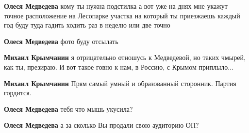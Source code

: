 \begin{itemize}
\begin{itemize}
\textbf{Олеся Медведева} кому ты нужна подстилка а вот уже на днях мне укажут точное расположение на Лесопарке участка на который ты приезжаешь каждый год буду туда гадить ходить раз в неделю или две точно

 
\textbf{Олеся Медведева} фото буду отсылать

 
\textbf{Михаил Крымчанин} я отрицательно отношусь к Медведевой, но таких чмырей, как ты, презираю. И вот такое говно к нам, в Россию, с Крымом приплыло...

 
\textbf{Михаил Крымчанин} Прям самый умный и образованный сторонник. Партия гордится.

 
\textbf{Олеся Медведева} тебя что мышь укусила?

 
\textbf{Олеся Медведева} а за сколько Вы продали свою аудиторию ОП?

 

\end{itemize}
\end{itemize}
